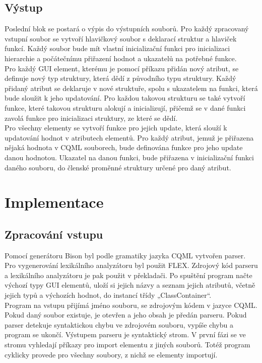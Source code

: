 \documentclass[report,11pt]{elsarticle}
\begin{document}
\subsection{\label{SEC:Intro}Výstup}
Poslední blok se postará o výpis do výstupních souborů. Pro každý zpracovaný vstupní soubor se vytvoří hlavičkový soubor s deklarací struktur a hlaviček funkcí. Každý soubor bude mít vlastní inicializační funkci pro inicializaci hierarchie a počátečnímu přiřazení hodnot a ukazatelů na potřebné funkce.\\
Pro každý GUI element, kterému je pomocí příkazu přidán nový atribut, se definuje nový typ struktury, která dědí z původního typu struktury. Každý přidaný atribut se deklaruje v nové struktuře, spolu s ukazatelem na funkci, která bude sloužit k jeho updatování. Pro každou takovou strukturu se také vytvoří funkce, které takovou strukturu alokují a inicializují, přičemž se v dané funkci zavolá funkce pro inicializaci struktury, ze které se dědí.\\
Pro všechny elementy se vytvoří funkce pro jejich update, která slouží k updatování hodnot v atributech elementů. Pro každý atribut, jemuž je přiřazena nějaká hodnota v CQML souborech, bude definována funkce pro jeho update danou hodnotou. Ukazatel na danou funkci, bude přiřazena v inicializační funkci daného souboru, do členské proměnné struktury určené pro daný atribut.\\



\section{\label{SEC:Intro}Implementace}

\subsection{\label{SEC:Intro}Zpracování vstupu}
Pomocí generátoru Bison byl podle gramatiky jazyka CQML vytvořen parser. Pro vygenerování lexikálního analyzátoru byl použit FLEX. Zdrojový kód parseru a lexikálního analyzátoru je pak použit v překladači.
Po spuštění program načte výchozí typy GUI elementů, uloží si jejich názvy a seznam jejich atributů, včetně jejich typů a výchozích hodnot, do instancí třídy „ClassContainer“.\\
Program na vstupu přijímá jméno souboru, se zdrojovým kódem v jazyce CQML. Pokud daný soubor existuje, je otevřen a jeho obsah je předán parseru. Pokud parser detekuje syntaktickou chybu ve zdrojovém souboru, vypíše chybu a program se ukončí. Výstupem parseru je syntaktický strom. V první fázi se ve stromu vyhledají příkazy pro import elementu z jiných souborů. Totéž program cyklicky provede pro všechny soubory, z nichž se elementy importují.
\end{document}
